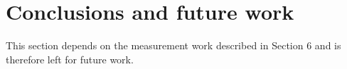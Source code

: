 \section{Conclusions and future work}
This section depends on the measurement work described in Section 6 and is therefore
left for future work.